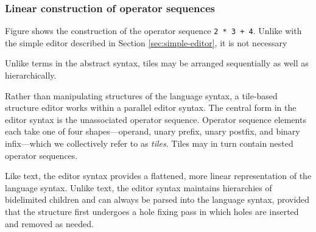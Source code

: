 \subsubsection{Linear construction of operator sequences}
Figure  shows the construction of the operator
sequence \texttt{2 * 3 + 4}. Unlike with the simple editor described
in Section \ref{sec:simple-editor}, it is not necessary

Unlike terms in the abstract syntax, tiles may be arranged
sequentially as well as hierarchically.

Rather than manipulating structures of the language syntax,
a tile-based structure editor works within a parallel editor syntax.
The central form in the editor syntax is the unassociated operator
sequence. Operator sequence elements each take one of four shapes---operand,
unary prefix, unary postfix, and
binary infix---which we collectively refer to as \emph{tiles}.
Tiles may in turn contain nested operator sequences.

Like text, the editor syntax provides a flattened, more linear representation
of the language syntax.
Unlike text, the editor syntax maintains hierarchies of
bidelimited children and can always be parsed into the
language syntax, provided that the structure first undergoes
a hole fixing pass in which holes are inserted and removed
as needed.



